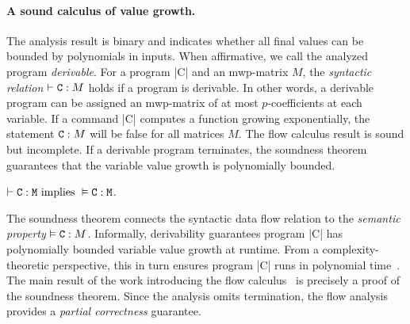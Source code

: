 \paragraph*{A sound calculus of value growth.}
The analysis result is binary and indicates whether all final values can be bounded by polynomials in inputs.
When affirmative, we call the analyzed program \emph{derivable}.
For a program \pr|C| and an mwp-matrix \(M\),
the \emph{syntactic relation} \(\vdash \prm{C} : M\) holds if a program is derivable.
In other words, a derivable program can be assigned an mwp-matrix of at most $p$-coefficients at each variable.
If a command \pr|C| computes a function growing exponentially, the statement \(\prm{C} : M\) will be false for all matrices \(M\).
The flow calculus result is sound but incomplete.
If a derivable program terminates,
the soundness theorem~\cite[p. 11]{jones2009} guarantees that the variable value growth is polynomially bounded.

\begin{theorem}\label{mwp-soundness}
\(\vdash \prm{C} : \prm{M}\text{ implies } \vDash \prm{C} : \prm{M}\).
\end{theorem}

The soundness theorem connects the syntactic data flow relation to the \emph{semantic property} \(\vDash \prm{C} : M\).
Informally, derivability guarantees program \pr|C| has polynomially bounded variable value growth at runtime.
From a complexity-theoretic perspective, this in turn ensures program \pr|C| runs in polynomial time~\cite{kristiansen2017}.
The main result of the work introducing the flow calculus~\cite{jones2009} is precisely a proof of the soundness theorem.
Since the analysis omits termination,
the flow analysis provides a \emph{partial correctness} guarantee.

